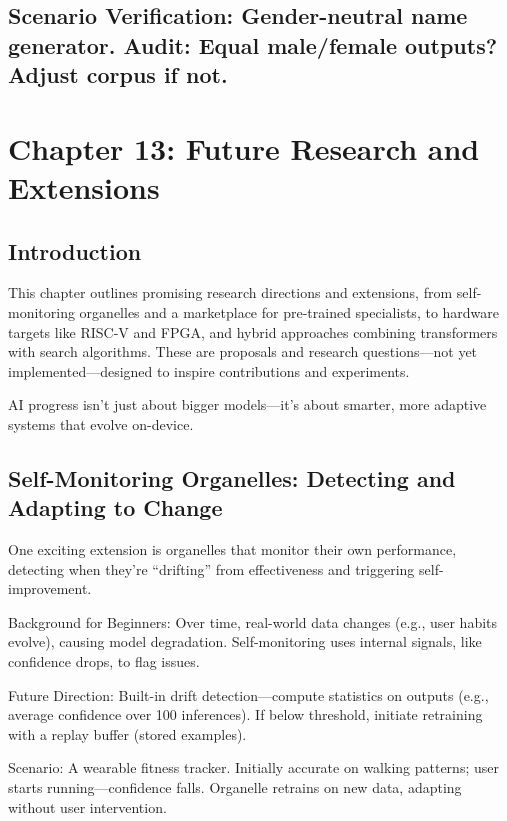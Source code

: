 \documentclass[
]{article}
\begin{document}
\subsection{Scenario Verification: Gender-neutral name generator. Audit:
Equal male/female outputs? Adjust corpus if
not.}\label{scenario-verification-gender-neutral-name-generator.-audit-equal-malefemale-outputs-adjust-corpus-if-not.}

\section{Chapter 13: Future Research and
Extensions}\label{chapter-13-future-research-and-extensions}

\subsection{Introduction}\label{introduction-12}

This chapter outlines promising research directions and extensions, from
self-monitoring organelles and a marketplace for pre-trained
specialists, to hardware targets like RISC-V and FPGA, and hybrid
approaches combining transformers with search algorithms. These are
proposals and research questions---not yet implemented---designed to
inspire contributions and experiments.

AI progress isn't just about bigger models---it's about smarter, more
adaptive systems that evolve on-device.

\subsection{Self-Monitoring Organelles: Detecting and Adapting to
Change}\label{self-monitoring-organelles-detecting-and-adapting-to-change}

One exciting extension is organelles that monitor their own performance,
detecting when they're ``drifting'' from effectiveness and triggering
self-improvement.

Background for Beginners: Over time, real-world data changes (e.g., user
habits evolve), causing model degradation. Self-monitoring uses internal
signals, like confidence drops, to flag issues.

Future Direction: Built-in drift detection---compute statistics on
outputs (e.g., average confidence over 100 inferences). If below
threshold, initiate retraining with a replay buffer (stored examples).

Scenario: A wearable fitness tracker. Initially accurate on walking
patterns; user starts running---confidence falls. Organelle retrains on
new data, adapting without user intervention.
\end{document}
